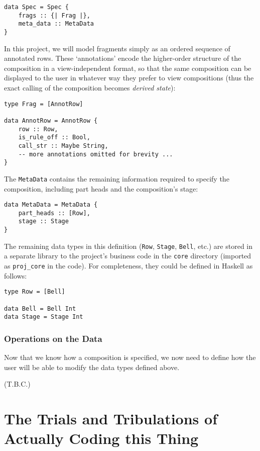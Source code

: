 \documentclass[12pt]{article}
\begin{document}
\begin{verbatim}
data Spec = Spec {
    frags :: {| Frag |},
    meta_data :: MetaData
}
\end{verbatim}

In this project, we will model fragments simply as an ordered sequence of annotated rows.  These
`annotations' encode the higher-order structure of the composition in a view-independent format,
so that the same composition can be displayed to the user in whatever way they prefer to view
compositions (thus the exact calling of the composition becomes \emph{derived state}):

\begin{verbatim}
type Frag = [AnnotRow]

data AnnotRow = AnnotRow {
    row :: Row,
    is_rule_off :: Bool,
    call_str :: Maybe String,
    -- more annotations omitted for brevity ...
}
\end{verbatim}

The \verb|MetaData| contains the remaining information required to specify the composition,
including part heads and the composition's stage:

\begin{verbatim}
data MetaData = MetaData {
    part_heads :: [Row],
    stage :: Stage
}
\end{verbatim}

The remaining data types in this definition (\verb|Row|, \verb|Stage|, \verb|Bell|, etc.) are stored
in a separate library to the project's business code in the \verb|core| directory (imported as
\verb|proj_core| in the code).  For completeness, they could be defined in Haskell as follows:

\begin{verbatim}
type Row = [Bell]

data Bell = Bell Int
data Stage = Stage Int
\end{verbatim}

\subsubsection{Operations on the Data}

Now that we know how a composition is specified, we now need to define how the user will be able to
modify the data types defined above.

(T.B.C.)



\pagebreak

\section{The Trials and Tribulations of Actually Coding this Thing}
\end{document}
